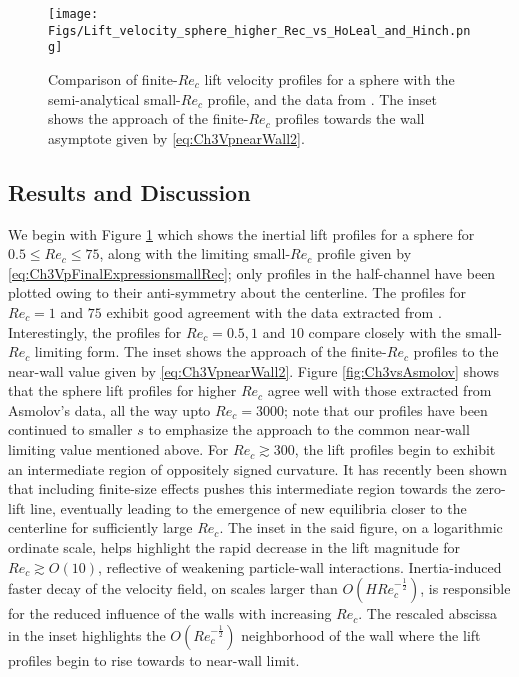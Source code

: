 \documentclass{jfm}
\begin{document}
\begin{figure}
	\centering
	\texttt{[image: Figs/Lift\_velocity\_sphere\_higher\_Rec\_vs\_HoLeal\_and\_Hinch.png]}
	\caption{Comparison of finite-$Re_c$ lift velocity profiles for a sphere with the semi-analytical small-$Re_c$ profile, and the data from \cite{schonberghinch1989}. The inset shows the approach of the finite-$Re_c$ profiles towards the wall asymptote given by \eqref{eq:Ch3VpnearWall2}.}
	\label{fig:Ch3vsHoLealHigherRec}
\end{figure}

\subsection{Results and Discussion}\label{sec:finiteRecResults}

We begin with Figure \ref{fig:Ch3vsHoLealHigherRec} which shows the inertial lift profiles for a sphere for $0.5 \leq Re_c \leq 75$, along with the limiting small-$Re_c$ profile given by \eqref{eq:Ch3VpFinalExpressionsmallRec}; only profiles in the half-channel have been plotted owing to their anti-symmetry about the centerline. The profiles for $Re_c=1$ and $75$ exhibit good agreement with the data extracted from \cite{schonberghinch1989}. Interestingly, the profiles for $Re_c = 0.5, 1$ and $10$ compare closely with the small-$Re_c$ limiting form. The inset shows the approach of the finite-$Re_c$ profiles to the near-wall value given by \eqref{eq:Ch3VpnearWall2}. Figure \ref{fig:Ch3vsAsmolov} shows that the sphere lift profiles for higher $Re_c$ agree well with those extracted from Asmolov's data\citep{asmolov1999}, all the way upto $Re_c=3000$; note that our profiles have been continued to smaller $s$ to emphasize the approach to the common near-wall limiting value mentioned above. For $Re_c \gtrsim 300$, the lift profiles begin to exhibit an intermediate region of oppositely signed curvature. It has recently been shown that including finite-size effects pushes this intermediate region towards the zero-lift line, eventually leading to the emergence of new equilibria closer to the centerline for sufficiently large $Re_c$\citep{anandfinitesize2022}. The inset in the said figure, on a logarithmic ordinate scale, helps highlight the rapid decrease in the lift magnitude for $Re_c\gtrsim O(10)$, reflective of weakening particle-wall interactions. Inertia-induced faster decay of the velocity field, on scales larger than $O(HRe_c^{-\frac{1}{2}})$, is responsible for the reduced influence of the walls with increasing $Re_c$. The rescaled abscissa in the inset highlights the $O(Re_c^{-\frac{1}{2}})$ neighborhood of the wall where the lift profiles begin to rise towards to near-wall limit.
\end{document}
